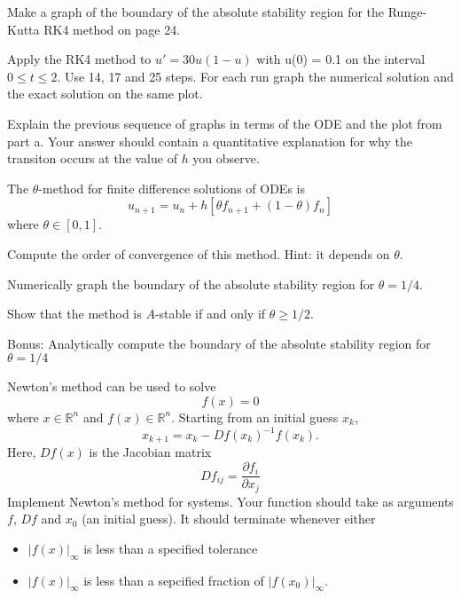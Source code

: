 \documentclass[minion]{homework}
\newcommand{\Reals}{\mathbb{R}}
\begin{document}
\begin{problems}

\problem 
\begin{subproblems}
\item
Make a graph of the boundary of the absolute stability
region for the Runge-Kutta RK4 method on page 24.

\item Apply the RK4 method to $u'=30u(1-u)$ with u(0) = 0.1 on the 
interval $0\le t\le 2$. Use 14, 17 and 25 steps. For each run
graph the numerical solution and 
the exact solution on the same plot. 

\item Explain the previous sequence of graphs in terms of the ODE and
the plot from part a.  Your answer should contain a quantitative explanation
for why the transiton occurs at the value of $h$ you observe.
\end{subproblems}

\problem The $\theta$-method for finite difference solutions of ODEs is
\[
u_{n+1} = u_n + h[\theta f_{n+1} + (1-\theta) f_n]
\]
where $\theta\in[0,1]$.
\begin{subproblems}
\item Compute the order of convergence of this method.  Hint:
it depends on $\theta$.
\item Numerically graph the boundary of the absolute stability region
for $\theta=1/4$.
\item Show that the method is $A$-stable if and only if $\theta\ge 1/2$.
\item Bonus: Analytically compute the boundary of the absolute
stability region for $\theta=1/4$
\end{subproblems}

\problem Newton's method can be used to solve
\[
f(x)=0
\]
where $x\in\Reals^n$ and $f(x)\in \Reals^n$.
Starting from an initial guess $x_k$,
\[
x_{k+1} = x_k - Df(x_k)^{-1} f(x_k).
\]
Here, $Df(x)$ is the Jacobian matrix
\[
Df_{ij} = \frac{\partial f_i}{\partial x_j}
\]
Implement Newton's method for systems.  Your
function should take as arguments $f$, $Df$
and $x_0$ (an initial guess).  It should terminate
whenever either 
\begin{itemize}
\item $|f(x)|_\infty$ is less than a specified tolerance
\item $|f(x)|_\infty$ is less than a sepcified fraction of $|f(x_0)|_\infty$.
\end{itemize}


\end{problems}
\end{document}
